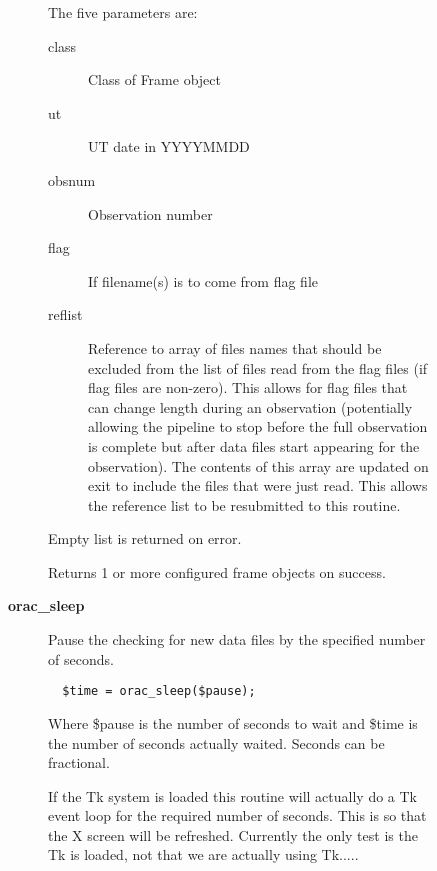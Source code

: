 \begin{description}
\begin{description}
\begin{description}
The five parameters are:

\begin{description}

\item[{class}] \mbox{}

Class of Frame object


\item[{ut}] \mbox{}

UT date in YYYYMMDD


\item[{obsnum}] \mbox{}

Observation number


\item[{flag}] \mbox{}

If filename(s) is to come from flag file


\item[{reflist}] \mbox{}

Reference to array of files names that should be excluded from
the list of files read from the flag files (if flag files are non-zero).
This allows for flag files that can change length during an observation
(potentially allowing the pipeline to stop before the full observation
is complete but after data files start appearing for the observation).
The contents of this array are updated on exit to include the files that
were just read. This allows the reference list to be resubmitted
to this routine.

\end{description}


Empty list is returned on error.



Returns 1 or more configured frame objects on success.


\item[{\textbf{orac\_sleep}}] \mbox{}

Pause the checking for new data files by the specified number of seconds.

\begin{verbatim}
  $time = orac_sleep($pause);
\end{verbatim}


Where \$pause is the number of seconds to wait and \$time is the number
of seconds actually waited. Seconds can be fractional.



If the Tk system is loaded this routine will actually do a Tk event loop
for the required number of seconds. This is so that the X screen will
be refreshed. Currently the only test is the Tk is loaded, not that
we are actually using Tk.....



\end{description}
\end{description}
\end{description}
